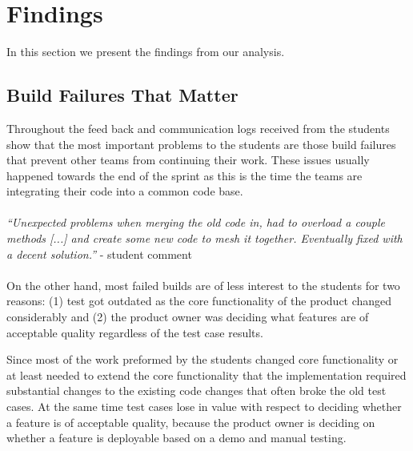 \section{Findings}
In this section we present the findings from our analysis.

\subsection{Build Failures That Matter}
Throughout the feed back and communication logs received from the students show that the most important problems to the students are those build failures that prevent other teams from continuing their work.
These issues usually happened towards the end of the sprint as this is the time the teams are integrating their code into a common code base.
\\ \ \\
\indent\emph{``Unexpected problems when merging the old code in, had to overload a couple methods [...]  and create some new code to mesh it together.  Eventually fixed with a decent solution.''} - student comment
\\ \ \\
\indent On the other hand, most failed builds are of less interest to the students for two reasons: 
(1) test got outdated as the core functionality of the product changed considerably 
and (2) the product owner was deciding what features are of acceptable quality regardless of the test case results.

Since most of the work preformed by the students changed core functionality or at least needed to extend the core functionality that the implementation required substantial changes to the existing code changes that often broke the old test cases.
At the same time test cases lose in value with respect to deciding whether a feature is of acceptable quality, because the product owner is deciding on whether a feature is deployable based on a demo and manual testing.

